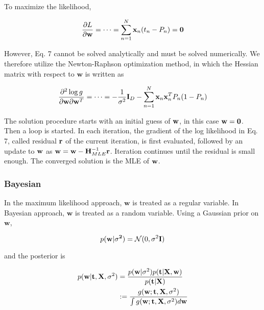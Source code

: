 \documentclass{article}
\begin{document}
To maximize the likelihood,

\begin{equation}
\frac{\partial L}{\partial \bf w} =\cdots= \sum_{n=1}^N {\bf x}_n(t_n-P_n) = {\bf 0} 
\end{equation}

However, Eq. 7 cannot be solved analytically and must be solved numerically. We therefore utilize the Newton-Raphson optimization method, in which the Hessian matrix with respect to $\textbf{w}$ is written as 

\begin{equation}
\frac{\partial^2\log g}{{\partial \bf w}\partial{\bf w}^T} = \cdots =
     -\frac{1}{\sigma^2}{\bf I}_D -\sum_{n=1}^N {\bf x}_n{\bf x}_n^TP_n(1-P_n)  
\end{equation}

The solution procedure starts with an initial guess of ${\bf w}$, in this case ${\bf w}={\bf 0}$. Then a loop is started. In each iteration, the gradient of the log likelihood in Eq. 7,
called residual ${\bf r}$ of the current iteration, is first evaluated, followed by an update to ${\bf w}$ as ${\bf w} = {\bf w} -{\bf H}_{MLE}^{-1}{\bf r}$. Iteration continues until the residual is small enough. The converged solution is the MLE of ${\bf w}$.

\subsubsection{Bayesian}

In the maximum likelihood approach, $\textbf{w}$ is treated as a regular variable. In Bayesian approach, $\textbf{w}$ is treated as a random variable. Using a Gaussian prior on $\textbf{w}$, 

\begin{equation}
p({\bf w|\sigma^2}) = \mathcal{N}(0,\sigma^2 {\bf I})
\end{equation}

and the posterior is 

\begin{equation}
\begin{split}
p({\bf w}|{\bf t},{\bf X},\sigma^2) & = \frac{p({\bf w}|\sigma^2) p({\bf t}|{\bf X},{\bf w})}{p({\bf t}|{\bf X})} \\
& :=\frac{g({\bf w};{\bf t},{\bf X},\sigma^2)}{\int g({\bf w};{\bf t},{\bf X},\sigma^2) d{\bf w}} 
\end{split}
\end{equation}
\end{document}
